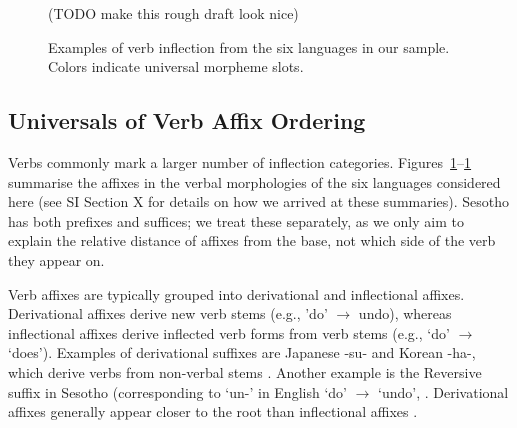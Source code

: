 \documentclass[11pt,letterpaper]{article}
\newcommand{\citep}{\parencite}
\newcommand\mhahn[1]{{\color{red}(#1)}}
\begin{document}
\begin{figure}
\mhahn{TODO make this rough draft look nice}
\caption{Examples of verb inflection from the six languages in our sample. Colors indicate universal morpheme slots.}\label{tab:examples-verbs}
\end{figure}
 
 


\subsection{Universals of Verb Affix Ordering}\label{sec:univ-verbs}
Verbs commonly mark a larger number of inflection categories.
Figures~\ref{tab:examples-verbs}--\ref{tab:examples-verbs} summarise the affixes in the verbal morphologies of the six languages considered here (see SI Section X for details on how we arrived at these summaries).
Sesotho has both prefixes and suffices; we treat these separately, as we only aim to explain the relative distance of affixes from the base, not which side of the verb they appear on.

Verb affixes are typically grouped into derivational and inflectional affixes.
Derivational affixes derive new verb stems (e.g., 'do' $\rightarrow$ undo), whereas inflectional affixes derive inflected verb forms from verb stems (e.g., `do' $\rightarrow$ `does').
Examples of derivational suffixes are Japanese -su- and Korean -ha-, which derive verbs from non-verbal stems \citep{hasegawa2014japanese, yeon2010korean}.
Another example is the Reversive suffix in Sesotho (corresponding to `un-' in English `do' $\rightarrow$ `undo', \citep{doke1967textbook}.
Derivational affixes generally appear closer to the root than inflectional affixes \citep{greenberg-universals-1963}.
\end{document}
